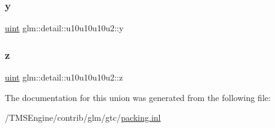 \subsubsection{\texorpdfstring{y}{y}}
{\footnotesize\ttfamily \hyperlink{group__core__precision_ga4fd29415871152bfb5abd588334147c8}{uint} glm\+::detail\+::u10u10u10u2\+::y}

\mbox{\label{unionglm_1_1detail_1_1u10u10u10u2_a8c4c851343129c55d86d6b0b7aed9b4f}} 
\subsubsection{\texorpdfstring{z}{z}}
{\footnotesize\ttfamily \hyperlink{group__core__precision_ga4fd29415871152bfb5abd588334147c8}{uint} glm\+::detail\+::u10u10u10u2\+::z}



The documentation for this union was generated from the following file\+:\begin{DoxyCompactItemize}
\item 
/\+T\+M\+S\+Engine/contrib/glm/gtc/\hyperlink{packing_8inl}{packing.\+inl}\end{DoxyCompactItemize}
